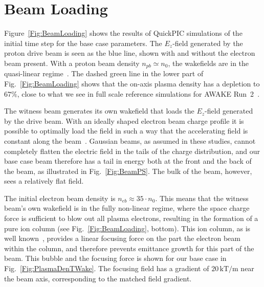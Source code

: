 \documentclass[aps,prstab,reprint,amsmath,amssymb,groupedaddress]{revtex4-1}
\newcommand{\unit}[1]{\,\mathrm{#1}}
\begin{document}
\section{Beam Loading}\label{S:BL}

Figure~\ref{Fig:BeamLoading} shows the results of QuickPIC simulations of the initial time step for the base case parameters. The $E_{z}$-field generated by the proton drive beam is seen as the blue line, shown with and without the electron beam present. With a proton beam density $n_{pb} \simeq n_{0}$, the wakefields are in the quasi-linear regime~\cite{rosenzweig:2010}. The dashed green line in the lower part of Fig.~\ref{Fig:BeamLoading} shows that the on-axis plasma density has a depletion to $67\%$, close to what we see in full scale reference simulations for AWAKE Run~2~\cite{awake_collaboration:2016}.

The witness beam generates its own wakefield that loads the $E_{z}$-field generated by the drive beam. With an ideally shaped electron beam charge profile it is possible to optimally load the field in such a way that the accelerating field is constant along the beam~\cite{katsouleas:1987, tzoufras:2009}. Gaussian beams, as assumed in these studies, cannot completely flatten the electric field in the tails of the charge distribution, and our base case beam therefore has a tail in energy both at the front and the back of the beam, as illustrated in Fig.~\ref{Fig:BeamPS}. The bulk of the beam, however, sees a relatively flat field.

The initial electron beam density is $n_{eb} \approx 35\cdot n_{0}$. This means that the witness beam's own wakefield is in the fully non-linear regime, where the space charge force is sufficient to blow out all plasma electrons, resulting in the formation of a pure ion column (see Fig.~\ref{Fig:BeamLoading}, bottom). This ion column, as is well known~\cite{rosenzweig:1991}, provides a linear focusing force on the part the electron beam within the column, and therefore prevents emittance growth for this part of the beam. This bubble and the focusing force is shown for our base case in Fig.~\ref{Fig:PlasmaDenTWake}. The focusing field has a gradient of $20\unit{kT/m}$ near the beam axis, corresponding to the matched field gradient.
\end{document}
